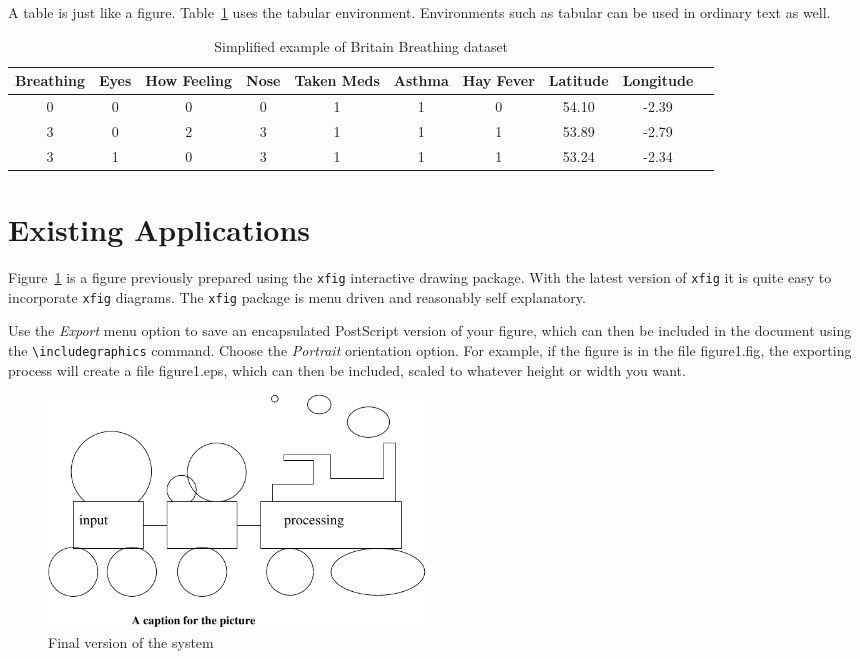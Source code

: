 A table is just like a figure. Table~\ref{wombat} uses the tabular
environment.  Environments such as tabular can be used in ordinary
text as well.
\begin{table}
\begin{center}
\begin{tabular}{|c|c|c|c|c|c|c|c|c|c}\hline\hline
Breathing&Eyes&How Feeling&Nose&Taken Meds&Asthma&Hay Fever&Latitude&Longitude\\\hline
0&0&0&0&1&1&0&54.10&-2.39\\
3&0&2&3&1&1&1&53.89&-2.79\\
3&1&0&3&1&1&1&53.24&-2.34\\\hline\hline
\end{tabular}
\end{center}
\caption{Simplified example of Britain Breathing dataset}\label{wombat}
\end{table}


\section{Existing Applications}
\label{sec:diagrams}

Figure~\ref{fig:fig-eg} is a figure previously prepared using the
\texttt{xfig} interactive drawing package. With the latest version of
\texttt{xfig} it is quite easy to incorporate \texttt{xfig} diagrams.
The \texttt{xfig} package is menu driven and reasonably self
explanatory.

Use the \emph{Export} menu option to save an encapsulated PostScript
version of your figure, which can then be included in the document
using the \verb=\includegraphics= command. Choose the \emph{Portrait}
orientation option. For example, if the figure is in the file \textsf{
  figure1.fig}, the exporting process will create a file \textsf{
  figure1.eps}, which can then be included, scaled to whatever height
or width you want.


\begin{figure}
\begin{center}
\includegraphics[width=10cm]{figure1} %
\end{center}
\caption{Final version of the system}
\label{fig:fig-eg}  
\end{figure}

